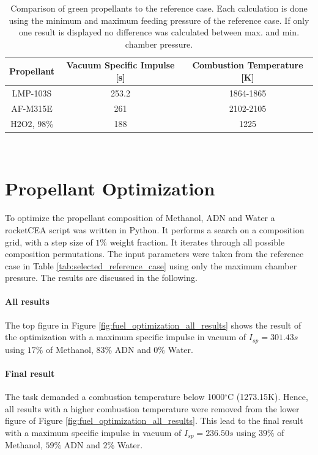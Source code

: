 \documentclass[12pt]{article}
\begin{document}
\begin{table}[!h]
	\centering
	\begin{tabular}{|c|c|c|}
		\hline
		Propellant & Vacuum Specific Impulse {[}s{]} & Combustion Temperature {[}K{]} \\ \hline
		LMP-103S   & 253.2 & 1864-1865  \\ \hline
		AF-M315E   & 261  & 2102-2105  \\ \hline
		H2O2, 98\% & 188   & 1225    \\ \hline     
	\end{tabular}\\
	\caption{Comparison of green propellants to the reference case. Each calculation is done using the minimum and maximum feeding pressure of the reference case. If only one result is displayed no difference was calculated between max. and min. chamber pressure.}
	\label{tab:comparison}
\end{table}

\section{Propellant Optimization}
\label{chap:task_b3}
To optimize the propellant composition of Methanol, ADN and Water a rocketCEA script was written in Python. It performs a search on a composition grid, with a step size of $1\%$ weight fraction. It iterates through all possible composition permutations. The input parameters were taken from the reference case in Table \ref{tab:selected_reference_case} using only the maximum chamber pressure. The results are discussed in the following.

\paragraph{All results}
The top figure in Figure \ref{fig:fuel_optimization_all_results} shows the result of the optimization with a maximum specific impulse in vacuum of $I_{sp}=301.43s$ using $17\%$ of Methanol, $83\%$ ADN and $0\%$ Water.

\paragraph{Final result}
The task demanded a combustion temperature below 1000$^\circ$C (1273.15K). Hence, all results with a higher combustion temperature were removed from the lower figure of Figure \ref{fig:fuel_optimization_all_results}. This lead to the final result with a maximum specific impulse in vacuum of $I_{sp}=236.50s$ using $39\%$ of Methanol, $59\%$ ADN and $2\%$ Water.\\
\end{document}
